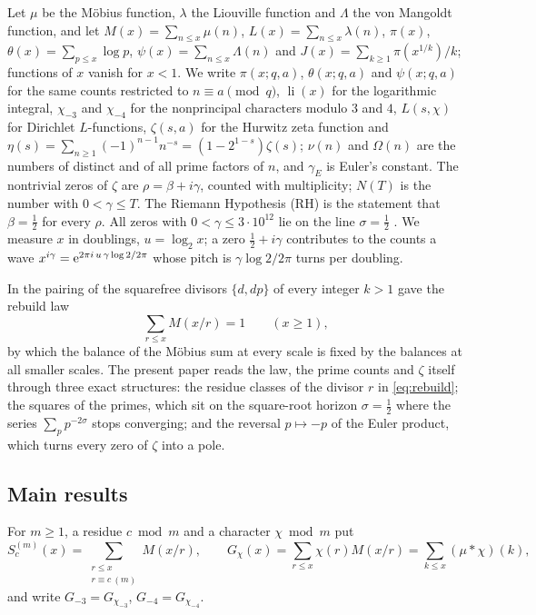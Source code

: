 \documentclass[11pt]{article}
\theoremstyle{definition}\newtheorem{definition}[theorem]{Definition}
\theoremstyle{remark}\newtheorem{remark}[theorem]{Remark}
\theoremstyle{definition}\newtheorem{axiom}{Axiom}
\newcommand{\li}{\operatorname{li}}\newcommand{\Tr}{\operatorname{Tr}}
\begin{document}
Let $\mu$ be the Möbius function, $\lambda$ the Liouville function and $\Lambda$ the von Mangoldt function, and let $M(x)=\sum_{n\le x}\mu(n)$, $L(x)=\sum_{n\le x}\lambda(n)$, $\pi(x)$, $\theta(x)=\sum_{p\le x}\log p$, $\psi(x)=\sum_{n\le x}\Lambda(n)$ and $J(x)=\sum_{k\ge1}\pi(x^{1/k})/k$; functions of $x$ vanish for $x<1$. We write $\pi(x;q,a)$, $\theta(x;q,a)$ and $\psi(x;q,a)$ for the same counts restricted to $n\equiv a\pmod q$, $\li(x)$ for the logarithmic integral, $\chi_{-3}$ and $\chi_{-4}$ for the nonprincipal characters modulo $3$ and $4$, $L(s,\chi)$ for Dirichlet $L$-functions, $\zeta(s,a)$ for the Hurwitz zeta function and $\eta(s)=\sum_{n\ge1}(-1)^{n-1}n^{-s}=(1-2^{1-s})\zeta(s)$; $\nu(n)$ and $\Omega(n)$ are the numbers of distinct and of all prime factors of $n$, and $\gamma_E$ is Euler's constant. The nontrivial zeros of $\zeta$ are $\rho=\beta+i\gamma$, counted with multiplicity; $N(T)$ is the number with $0<\gamma\le T$. The Riemann Hypothesis (RH) is the statement that $\beta=\frac12$ for every $\rho$. All zeros with $0<\gamma\le3\cdot10^{12}$ lie on the line $\sigma=\frac12$ \cite{PT}. We measure $x$ in doublings, $u=\log_2x$; a zero $\frac12+i\gamma$ contributes to the counts a wave $x^{i\gamma}=\mathrm e^{2\pi i\,u\,\gamma\log2/2\pi}$ whose pitch is $\gamma\log2/2\pi$ turns per doubling.

In \cite{S10} the pairing of the squarefree divisors $\{d,dp\}$ of every integer $k>1$ gave the rebuild law
\begin{equation}\label{eq:rebuild}
\sum_{r\le x}M(x/r)=1\qquad(x\ge1),
\end{equation}
by which the balance of the Möbius sum at every scale is fixed by the balances at all smaller scales. The present paper reads the law, the prime counts and $\zeta$ itself through three exact structures: the residue classes of the divisor $r$ in \eqref{eq:rebuild}; the squares of the primes, which sit on the square-root horizon $\sigma=\frac12$ where the series $\sum_pp^{-2\sigma}$ stops converging; and the reversal $p\mapsto-p$ of the Euler product, which turns every zero of $\zeta$ into a pole.

\subsection{Main results}

For $m\ge1$, a residue $c\bmod m$ and a character $\chi\bmod m$ put
\begin{equation}\label{eq:classsum}
S^{(m)}_c(x)=\sum_{\substack{r\le x\\ r\equiv c\ (m)}}M(x/r),\qquad G_\chi(x)=\sum_{r\le x}\chi(r)M(x/r)=\sum_{k\le x}(\mu*\chi)(k),
\end{equation}
and write $G_{-3}=G_{\chi_{-3}}$, $G_{-4}=G_{\chi_{-4}}$.
\end{document}
